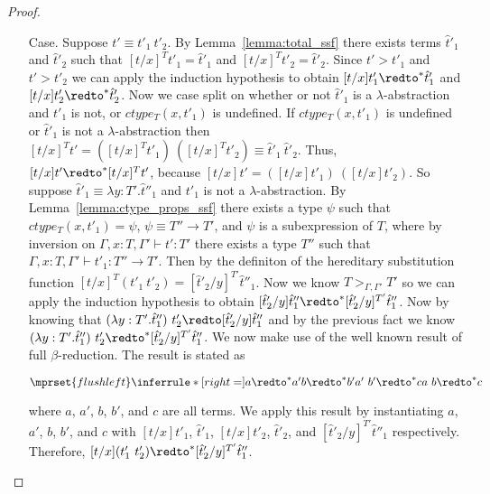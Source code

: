 \begin{proof}
\begin{itemize}
\item[Case.] Suppose $t' \equiv t'_1\ t'_2$.  By Lemma~\ref{lemma:total_ssf}
  there exists terms $\hat{t}'_1$ and $\hat{t}'_2$
  such that $[t/x]^T t'_1 = \hat{t}'_1$ and $[t/x]^T t'_2 = \hat{t}'_2$.  Since
  $t' > t'_1$ and $t' > t'_2$ we can apply the induction hypothesis to obtain
  $[t/x]t'_1 \redto^* \hat{t}'_1$ and $[t/x]t'_2 \redto^* \hat{t}'_2$.  Now we case
  split on whether or not $\hat{t}'_1$ is a $\lambda$-abstraction and $t'_1$ is not, or $ctype_T(x,t'_1)$ is undefined. If
  $ctype_T(x,t'_1)$ is undefined or $\hat{t}'_1$ is not a $\lambda$-abstraction then 
  $[t/x]^T t' = ([t/x]^T t'_1)\ ([t/x]^T t'_2) \equiv \hat{t}'_1\ \hat{t}'_2$. Thus,
  $[t/x]t' \redto^* [t/x]^T t'$, because $[t/x]t' = ([t/x] t'_1)\ ([t/x] t'_2)$.  So suppose 
  $\hat{t}'_1 \equiv \lambda y:T'.\hat{t}''_1$ and $t'_1$ is not a $\lambda$-abstraction.  
  By Lemma~\ref{lemma:ctype_props_ssf} there exists a type $\psi$ such that
  $ctype_T(x,t'_1) = \psi$, $\psi \equiv T'' \to T'$, and $\psi$ is a subexpression
  of $T$, where by inversion on $\Gamma,x:T,\Gamma' \vdash t':T'$ there exists a type
  $T''$ such that $\Gamma,x:T,\Gamma' \vdash t'_1:T'' \to T'$.  
  Then by the definiton of the hereditary substitution function $[t/x]^T (t'_1\ t'_2) = 
  [\hat{t}'_2/y]^{T'} \hat{t}''_1$.
  Now we know $T >_{\Gamma,\Gamma'} T'$ so 
  we can apply the induction hypothesis to obtain 
  $[\hat{t}'_2/y] \hat{t}''_1 \redto^* [\hat{t}'_2/y]^{T'} \hat{t}''_1$.  Now by knowing that 
  $(\lambda y:T'.\hat{t}''_1)\ t'_2 \redto [\hat{t}'_2/y] \hat{t}''_1$ and
  by the previous fact we know $(\lambda y:T'.\hat{t}''_1)\ t'_2 \redto^* [\hat{t}'_2/y]^{T'} \hat{t}''_1$.
  We now make use of the well known result of full $\beta$-reduction.  The
  result is stated as
  \begin{center}
    \begin{math}
      $$\mprset{flushleft}
      \inferrule* [right=] {
        a \redto^* a'
        \\\\
        b \redto^* b'
        \\
        a'\ b' \redto^* c
      }{a\ b \redto^* c}
    \end{math}
  \end{center}
  where $a$, $a'$, $b$, $b'$, and $c$ are all terms.  We apply this
  result by instantiating $a$, $a'$, $b$, $b'$, and $c$ with
  $[t/x] t'_1$, $\hat{t}'_1$, $[t/x] t'_2$, $\hat{t}'_2$, and $[\hat{t}'_2/y]^{T'} \hat{t}''_1$ 
  respectively.  Therefore, $[t/x](t'_1\ t'_2) \redto^* [\hat{t}'_2/y]^{T'} \hat{t}''_1$.    
  

\end{itemize}
\end{proof}
